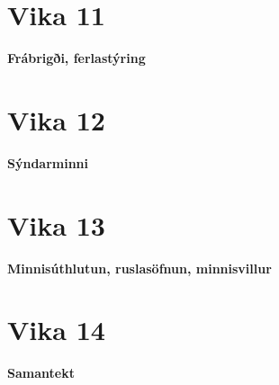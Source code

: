 \documentclass{article}
\begin{document}
\section{Vika 11}
\large{\textbf{Frábrigði, ferlastýring}}

\section{Vika 12}
\large{\textbf{Sýndarminni}}

\section{Vika 13}
\large{\textbf{Minnisúthlutun, ruslasöfnun, minnisvillur}}


\section{Vika 14}
\large{\textbf{Samantekt}}
\end{document}

